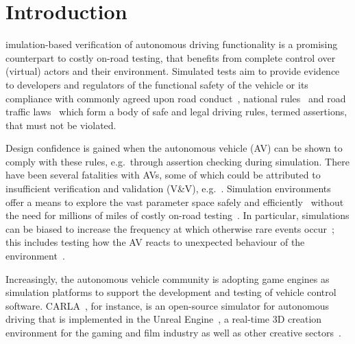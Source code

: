 \documentclass[letterpaper, 10 pt, journal, twoside]{IEEEtran}
\begin{document}
\section{Introduction} \label{s:introduction}
%
imulation-based verification of autonomous driving functionality is a promising counterpart to costly on-road testing, that benefits from complete control over (virtual) actors and their environment.
%
Simulated tests aim to provide evidence to developers and regulators of the functional safety of the vehicle or its compliance with commonly agreed upon road conduct~\cite{ViennaConv}, national rules~\cite{codes2015highway} and road traffic laws~\cite{RoadTraffic1988} which form a body of safe and legal driving rules, termed assertions, that must not be violated. 

Design confidence is gained when the autonomous vehicle (AV) can be shown to comply with these rules, e.g.\ through assertion checking during simulation. 
There have been several fatalities with AVs, some of which could be attributed to insufficient verification and validation (V\&V), e.g.~\cite{FatalityExample}. Simulation environments offer a means to explore the vast parameter space safely and efficiently~\cite{korosec2019waymo} without the need for millions of miles of costly on-road testing~\cite{kalra2016driving}. In particular, simulations can be biased to increase the frequency at which otherwise rare events occur~\cite{Koopman2018}; this includes testing how the AV reacts to unexpected behaviour of the environment~\cite{RobustnessAutonomy}. 

Increasingly, the autonomous vehicle community is adopting game engines as simulation platforms to support the development and testing of vehicle control software. 
%
CARLA~\cite{carla_main_website}, for instance, is an open-source simulator for autonomous driving that is implemented in the Unreal Engine~\cite{UE4_main_website}, a real-time 3D creation environment for the gaming and film industry as well as other creative sectors~\cite{CARLA_paper}. 
\end{document}
